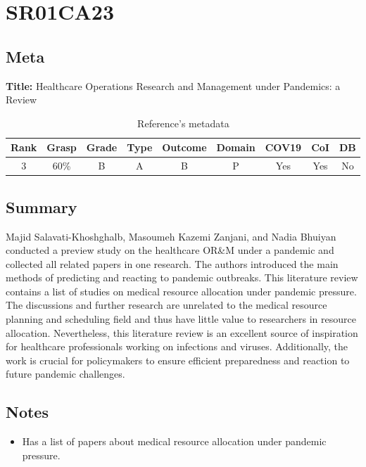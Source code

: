 \section{ SR01CA23 }


\subsection{Meta}

    \textbf{Title:}
    Healthcare Operations Research and Management under Pandemics: a Review

    \begin{table}[H]
        \centering
        \begin{tabular}{|c|c|c|c|c|c|c|c|c|}
            \hline
                \textbf{Rank} & \textbf{Grasp} & \textbf{Grade} & \textbf{Type} & \textbf{Outcome} & \textbf{Domain} & \textbf{COV19} & \textbf{CoI} & \textbf{DB} \\
            \hline
                3 & 60\% & B & A & B & P & Yes & Yes & No \\
            \hline
        \end{tabular}
        \caption{Reference's metadata}
        \label{tab:SR01CA23}
    \end{table}

\subsection{Summary}
    Majid Salavati-Khoshghalb, Masoumeh Kazemi Zanjani, and Nadia Bhuiyan \cite{x128} conducted a preview study on the healthcare OR\&M under a pandemic and collected all related papers in one research. The authors introduced the main methods of predicting and reacting to pandemic outbreaks. This literature review contains a list of studies on medical resource allocation under pandemic pressure. The discussions and further research are unrelated to the medical resource planning and scheduling field and thus have little value to researchers in resource allocation. Nevertheless, this literature review is an excellent source of inspiration for healthcare professionals working on infections and viruses. Additionally, the work is crucial for policymakers to ensure efficient preparedness and reaction to future pandemic challenges.

\subsection{Notes}
    \begin{itemize}
        \item Has a list of papers about medical resource allocation under pandemic pressure.
    \end{itemize}


